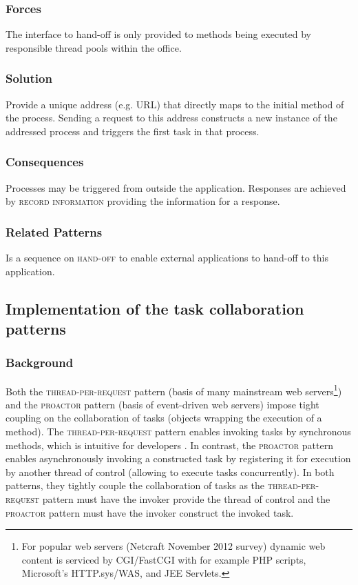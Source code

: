 \documentclass[prodmode]{style/acmlarge}
\begin{document}
\subsubsection*{Forces} The interface to hand-off is only provided to methods
being executed by responsible thread pools within the office.

\subsubsection*{Solution} Provide a unique address (e.g. URL) that directly maps
to the initial method of the process.  Sending a request to this address
constructs a new instance of the addressed process and triggers the first task
in that process.

\subsubsection*{Consequences} Processes may be triggered from outside the
application. Responses are achieved by \textsc{record information} providing the
information for a response.

\subsubsection*{Related Patterns} Is a sequence on \textsc{hand-off} to enable
external applications to hand-off to this application.



\subsection{Implementation of the task collaboration patterns}

\subsubsection*{Background}

Both the \textsc{thread-per-request} pattern \cite{thread-per-request} (basis of
many mainstream web servers\footnote{For popular web servers (Netcraft November
2012 survey) dynamic web content is serviced by CGI/FastCGI with for example PHP
scripts, Microsoft's HTTP.sys/WAS, and JEE Servlets.}) and the \textsc{proactor}
pattern \cite{proactor} (basis of event-driven web servers) impose tight
coupling on the collaboration of tasks (objects wrapping the execution of a
method).  The \textsc{thread-per-request} pattern enables invoking tasks by
synchronous methods, which is intuitive for developers \cite[p. 2]{proactor}.
In contrast, the \textsc{proactor} pattern enables asynchronously invoking a
constructed task by registering it for execution by another thread of control
(allowing to execute tasks concurrently).  In both patterns, they tightly couple
the collaboration of tasks as the \textsc{thread-per-request} pattern must have
the invoker provide the thread of control and the \textsc{proactor} pattern must
have the invoker construct the invoked task.
\end{document}
